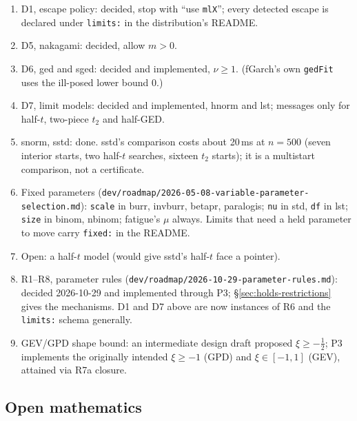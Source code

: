 \documentclass[11pt]{article}
\newcommand{\code}[1]{\texttt{#1}}
\theoremstyle{plain}
\theoremstyle{definition}
\theoremstyle{remark}
\begin{document}
\begin{enumerate}
  \item D1, escape policy: decided, stop with ``use \code{mlX}''; every
    detected escape is declared under \code{limits:} in the distribution's
    README.
  \item D5, nakagami: decided, allow $m > 0$.
  \item D6, ged and sged: decided and implemented, $\nu \ge 1$. (fGarch's
    own \code{gedFit} uses the ill-posed lower bound $0$.)
  \item D7, limit models: decided and implemented, hnorm and lst; messages
    only for half-$t$, two-piece $t_2$ and half-GED.
  \item snorm, sstd: done. sstd's comparison costs about 20\,ms at
    $n = 500$ (seven interior starts, two half-$t$ searches, sixteen $t_2$
    starts); it is a multistart comparison, not a certificate.
  \item Fixed parameters (\code{dev/roadmap/2026-05-08-variable-parameter-selection.md}):
    \code{scale} in burr, invburr, betapr, paralogis; \code{nu} in std,
    \code{df} in lst; \code{size} in binom, nbinom; fatigue's $\mu$ always.
    Limits that need a held parameter to move carry \code{fixed:} in the
    README.
  \item Open: a half-$t$ model (would give sstd's half-$t$ face a pointer).
  \item R1--R8, parameter rules (\code{dev/roadmap/2026-10-29-parameter-rules.md}):
    decided 2026-10-29 and implemented through P3; \S\ref{sec:holds-restrictions}
    gives the mechanisms. D1 and D7 above are now instances of R6 and the
    \code{limits:} schema generally.
  \item GEV/GPD shape bound: an intermediate design draft proposed
    $\xi\ge-\tfrac12$; P3 implements the originally intended $\xi\ge-1$
    (GPD) and $\xi\in[-1,1]$ (GEV), attained via R7a closure.
\end{enumerate}

\subsection*{Open mathematics}
\end{document}
